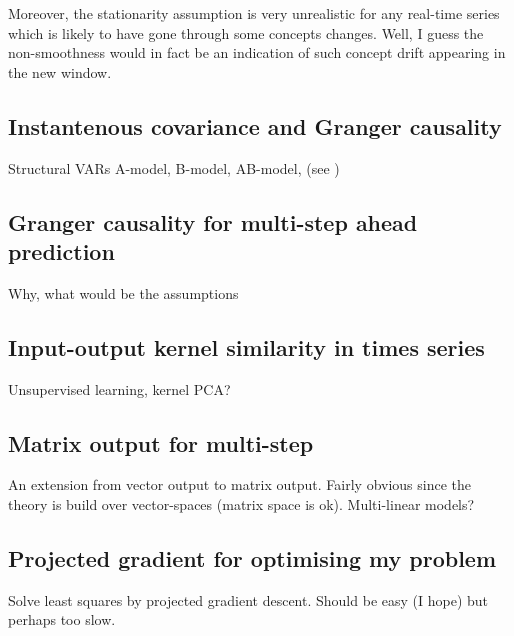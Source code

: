 \documentclass[a4paper]{article}
\begin{document}
Moreover, the stationarity assumption is very unrealistic for any real-time series which is likely to have gone through some concepts changes. Well, I guess the non-smoothness would in fact be an indication of such concept drift appearing in the new window.







\subsection{Instantenous covariance and Granger causality}

Structural VARs A-model, B-model, AB-model, (see \cite{Lutkepohl2005})

\subsection{Granger causality for multi-step ahead prediction}

Why, what would be the assumptions

\subsection{Input-output kernel similarity in times series}

Unsupervised learning, kernel PCA?

\subsection{Matrix output for multi-step}

An extension from vector output to matrix output. Fairly obvious since the theory is build over vector-spaces (matrix space is ok). Multi-linear models?

\subsection{Projected gradient for optimising my problem}

Solve least squares by projected gradient descent. Should be easy (I hope) but perhaps too slow.
\end{document}
